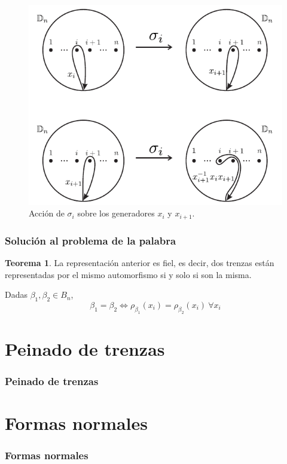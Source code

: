 \documentclass{beamer}
\theoremstyle{definition}
\newtheorem{teorema}{Teorema}
\begin{document}
\begin{frame}
\begin{figure}[h!]
\includegraphics[scale=0.5]{Imagenes/auto.png}
\caption{Acción de $\sigma_i$ sobre los generadores $x_i$ y $x_{i+1}$.}
\end{figure}
\end{frame}

\begin{frame}
\frametitle{Solución al problema de la palabra}
\begin{teorema}
La representación anterior es fiel, es decir, dos trenzas están representadas por el mismo automorfismo si y solo si son la misma.
\end{teorema}

Dadas $\beta_1,\beta_2\in B_n$, 
$$\beta_1=\beta_2\Leftrightarrow \rho_{\beta_1}(x_i)=\rho_{\beta_2}(x_i)\ \forall x_i$$
\end{frame}

\section{Peinado de trenzas}
\begin{frame}
\frametitle{Peinado de trenzas}
\end{frame}



\section{Formas normales}
\begin{frame}
\frametitle{Formas normales}
\end{frame}
\end{document}
